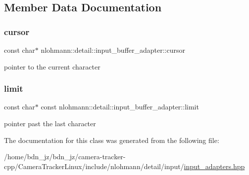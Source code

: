 \subsection{Member Data Documentation}
\mbox{\label{classnlohmann_1_1detail_1_1input__buffer__adapter_a49e6c8b6555af489a45ef51737eafa1c}} 
\subsubsection{\texorpdfstring{cursor}{cursor}}
{\footnotesize\ttfamily const char$\ast$ nlohmann\+::detail\+::input\+\_\+buffer\+\_\+adapter\+::cursor\hspace{0.3cm}{\ttfamily [private]}}



pointer to the current character 

\mbox{\label{classnlohmann_1_1detail_1_1input__buffer__adapter_abbea9cdb1862e55bc1e142a72a947da4}} 
\subsubsection{\texorpdfstring{limit}{limit}}
{\footnotesize\ttfamily const char$\ast$ const nlohmann\+::detail\+::input\+\_\+buffer\+\_\+adapter\+::limit\hspace{0.3cm}{\ttfamily [private]}}



pointer past the last character 



The documentation for this class was generated from the following file\+:\begin{DoxyCompactItemize}
\item 
/home/bdn\+\_\+jz/bdn\+\_\+jz/camera-\/tracker-\/cpp/\+Camera\+Tracker\+Linux/include/nlohmann/detail/input/\hyperlink{input__adapters_8hpp}{input\+\_\+adapters.\+hpp}\end{DoxyCompactItemize}
